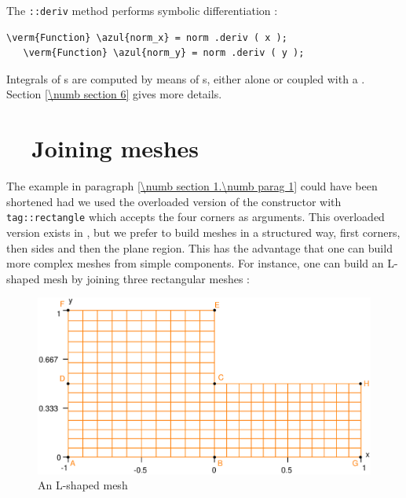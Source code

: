 The {\small\tt{}::deriv} method performs symbolic differentiation :

\begin{Verbatim}[commandchars=\\\{\},formatcom=\small\tt,baselinestretch=0.94]
   \verm{Function} \azul{norm_x} = norm .deriv ( x );
   \verm{Function} \azul{norm_y} = norm .deriv ( y );
\end{Verbatim}

Integrals of {\small\tt{}}s are computed by means of {\small\tt{}}s,
either alone or coupled with a {\small\tt{}}.
Section \ref{\numb section 6} gives more details.


\section{~~Joining meshes}\label{\numb section 1.\numb parag 4}

The example in paragraph \ref{\numb section 1.\numb parag 1} could have been shortened
had we used the overloaded version of the {\small\tt {}} constructor with
{\small\tt \textcolor{tag}{tag}::rectangle} which accepts the four corners as arguments. 
This overloaded version exists in \maniFEM, but we prefer to build meshes in a structured way, 
first corners, then sides and then the plane region. 
This has the advantage that one can build more complex meshes from simple components. 
For instance, one can build an L-shaped mesh by joining three rectangular meshes :

\begin{figure}[ht] \centering
  \includegraphics[width=115mm]{L-shaped}
  \caption{An L-shaped mesh}
  \label{\numb section 1.\numb fig 5}
\end{figure}

